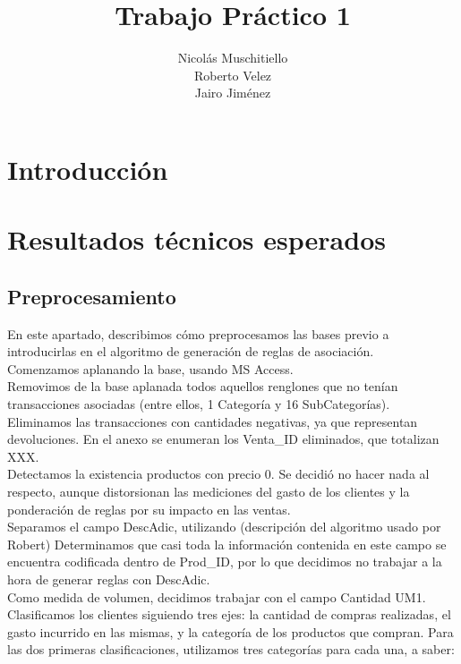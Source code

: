 \documentclass[]{article}
\title{Trabajo Práctico 1}
\author{Nicolás Muschitiello \\
	Roberto Velez\\
	Jairo Jiménez
	}
\begin{document}
\maketitle

\section{Introducción}




\section{Resultados técnicos esperados}
\subsection{Preprocesamiento}
En este apartado, describimos cómo preprocesamos las bases previo a introducirlas en el algoritmo de generación de reglas de asociación.\\

Comenzamos aplanando la base, usando MS Access.\\

Removimos de la base aplanada todos aquellos renglones que no tenían transacciones asociadas (entre ellos, 1 Categoría y 16 SubCategorías).\\

Eliminamos las transacciones con cantidades negativas, ya que representan devoluciones. En el anexo se enumeran los Venta\_ID eliminados, que totalizan XXX.\\

Detectamos la existencia productos con precio 0. Se decidió no hacer nada al respecto, aunque distorsionan las mediciones del gasto de los clientes y la ponderación de reglas por su impacto en las ventas.\\

Separamos el campo DescAdic, utilizando (descripción del algoritmo usado por Robert) Determinamos que casi toda la información contenida en este campo se encuentra codificada dentro de Prod\_ID, por lo que decidimos no trabajar a la hora de generar reglas con DescAdic.\\

Como medida de volumen, decidimos trabajar con el campo Cantidad UM1.\\

Clasificamos los clientes siguiendo tres ejes: la cantidad de compras realizadas, el gasto incurrido en las mismas, y la categoría de los productos que compran. Para las dos primeras clasificaciones, utilizamos tres categorías para cada una, a saber:\\
\end{document}
